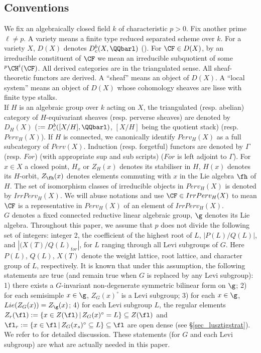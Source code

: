 \subsection*{Conventions}
     We fix an algebraically closed field $k$ of characteristic $p>0$. Fix another prime $\ell\neq p$. A variety means a finite type reduced separated scheme over $k$. For a variety $X$, $D(X)$ denotes $D^b_c(X,\QQbarl)$ (\cite[]{weil_II}). For $\CF\in D(X)$, by an irreducible constituent of $\CF$ we mean an irreducible subquotient of some $^p\CH^i(\CF)$. All derived categories are in the triangulated sense. All sheaf-theoretic functors are derived. A “sheaf” means an object of $D(X)$. A “local system” means an object of $D(X)$ whose cohomology sheaves are lisse with finite type stalks.\\
     
     If $H$ is an algebraic group over $k$ acting on $X$, the triangulated (resp. abelian) category of $H$-equivariant sheaves (resp. perverse sheaves) are denoted by $D_H(X)$ ($:=D^b_c([X/H],\QQbarl)$, $[X/H]$ being the quotient stack) (resp. $Perv_H(X)$). If $H$ is connected, we canonically identify $Perv_H(X)$ as a full subcategory of $Perv(X)$. Induction (resp. forgetful) functors are denoted by $\Gamma$ (resp. $For$) (with appropriate sup and sub scripts) ($For$ is left adjoint to $\Gamma$). For $x\in X$ a closed point, $H_x$ or $Z_H(x)$ denotes its stabiliser in $H$, $H(x)$ denotes its $H$-orbit, $Z_\fh(x)$ denotes elements commuting with $x$ in the Lie algebra $\fh$ of $H$. The set of isomorphism classes of irreducible objects in $Perv_H(X)$ is denoted by $IrrPerv_H(X)$. We will abuse notations and use $\CF\in IrrPerv_H(X)$ to mean $\CF$ is a representative in $Perv_H(X)$ of an element of $IrrPerv_H(X)$. \\
    
     $G$ denotes a fixed connected reductive linear algebraic group, $\g$ denotes its Lie algebra. Throughout this paper, we assume that $p$ does not divide the following set of integers: integer 2, the coefficient of the highest root of $L$, $|P(L)/Q(L)|$, and $|(X(T)/Q(L)_{tor}|$, for $L$ ranging through all Levi subgroups of $G$. Here $P(L)$, $Q(L)$, $X(T)$ denote the weight lattice, root lattice, and character group of $L$, respectively. It is known that under this assumption, the following statements are true (and remain true when $G$ is replaced by any Levi subgroup): 1) there exists a $G$-invariant non-degenerate symmetric bilinear form on $\g$; 2) for each semisimple $x\in\g$, $Z_G(x)^\circ$ is a Levi subgroup; 3) for each $x\in\g$, $Lie(Z_G(x))=Z_\g(x)$; 4) for each Levi subgroup $L$, the regular elements $Z_r(\fl):=\{x\in Z(\fl)\,|\, Z_G(x)^\circ=L\}\subseteq Z(\fl)$ and $\fl_r:=\{x\in\fl\,|\,Z_G(x_s)^\circ\subseteq L\}\subseteq \fl$ are open dense (see §\ref{sec_lusztigstrat}). We refer to \cite[, 2.6]{letellier_fourier_2005} for detailed discussion. These statements (for $G$ and each Levi subgroup) are what are actually needed in this paper.\\

